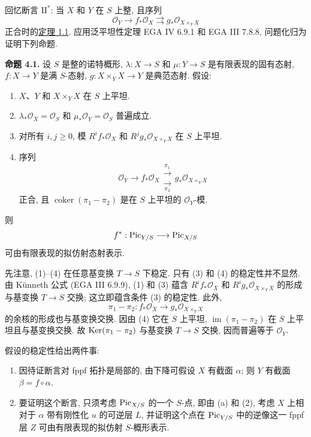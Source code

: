 回忆断言 $\mathrm{II}^*$: 当 $X$ 和 $Y$ 在 $S$ 上整, 且序列
\[
  \mathcal O_Y\longrightarrow f_*\mathcal O_X
  \rightrightarrows g_*\mathcal O_{X\times_YX}
\]
正合时的\hyperlink{sga6.e12.thm.1-1}{定理 1.1}. 应用泛平坦性定理 EGA IV 6.9.1 和 EGA III 7.8.8, 问题化归为证明下列命题.

\textbf{命题 4.1.} 设 $S$ 是整的诺特概形, $\lambda:X\to S$ 和 $\mu:Y\to S$ 是有限表现的固有态射, $f:X\to Y$ 是满 $S$-态射, $g:X\times_YX\to Y$ 是典范态射. 假设:
\begin{enumerate}[label=\arabic*)]
\item $X$、$Y$ 和 $X\times_YX$ 在 $S$ 上平坦.
\item $\lambda_*\mathcal O_X=\mathcal O_S$ 和 $\mu_*\mathcal O_Y=\mathcal O_S$ 普遍成立.
\item 对所有 $i,j\geq0$, 模 $R^if_*\mathcal O_X$ 和 $R^jg_*\mathcal O_{X\times_YX}$ 在 $S$ 上平坦.
\item 序列
  \begin{equation}\tag{*}
    \mathcal O_Y\longrightarrow f_*\mathcal O_X
    \mathrel{\substack{\xrightarrow{\pi_1}\\[-0.7ex]
                       \xrightarrow[\pi_2]{}}}
    g_*\mathcal O_{X\times_YX}
  \end{equation}
  正合, 且 $\operatorname{coker}(\pi_1-\pi_2)$ 是在 $S$ 上平坦的 $\mathcal O_Y$-模.
\end{enumerate}
则
\[
  f^*:\operatorname{Pic}_{Y/S}\longrightarrow\operatorname{Pic}_{X/S}
\]
可由有限表现的拟仿射态射表示.

先注意, (1)--(4) 在任意基变换 $T\to S$ 下稳定. 只有 (3) 和 (4) 的稳定性并不显然. 由 K\"unneth 公式 (EGA III 6.9.9), (1) 和 (3) 蕴含 $R^if_*\mathcal O_X$ 和 $R^ig_*\mathcal O_{X\times_YX}$ 的形成与基变换 $T\to S$ 交换; 这立即蕴含条件 (3) 的稳定性. 此外,
\[
  \pi_1-\pi_2:f_*\mathcal O_X
  \longrightarrow g_*\mathcal O_{X\times_YX}
\]
的余核的形成也与基变换交换. 因由 (4) 它在 $S$ 上平坦, $\operatorname{im}(\pi_1-\pi_2)$ 在 $S$ 上平坦且与基变换交换. 故 $\operatorname{Ker}(\pi_1-\pi_2)$ 与基变换 $T\to S$ 交换, 因而普遍等于 $\mathcal O_Y$.

假设的稳定性给出两件事:
\begin{enumerate}[label=\alph*.]
\item 因待证断言对 fppf 拓扑是局部的, 由下降可假设 $X$ 有截面 $\alpha$; 则 $Y$ 有截面 $\beta=f\circ\alpha$.
\item 要证明这个断言, 只须考虑 $\operatorname{Pic}_{X/S}$ 的一个 $S$-点, 即由 (a) 和 (2), 考虑 $X$ 上相对于 $\alpha$ 带有刚性化 $u$ 的可逆层 $L$, 并证明这个点在 $\operatorname{Pic}_{Y/S}$ 中的逆像这一 fppf 层 $Z$ 可由有限表现的拟仿射 $S$-概形表示.
\end{enumerate}

